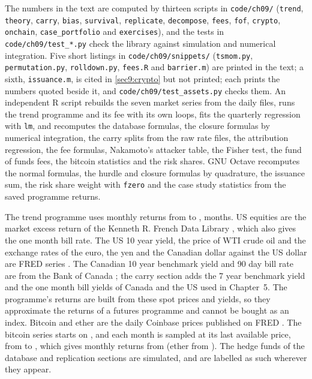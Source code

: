 \begin{chapterrefs}
\begin{keybox}
The numbers in the text are computed by thirteen scripts in \texttt{code/ch09/} (\texttt{trend},
\texttt{theory}, \texttt{carry}, \texttt{bias}, \texttt{survival}, \texttt{replicate},
\texttt{decompose}, \texttt{fees}, \texttt{fof}, \texttt{crypto}, \texttt{onchain},
\texttt{case\_portfolio} and \texttt{exercises}), and the tests in \texttt{code/ch09/test\_*.py} check
the library against simulation and numerical integration. Five short listings in
\texttt{code/ch09/snippets/} (\texttt{tsmom.py}, \texttt{permutation.py}, \texttt{rolldown.py},
\texttt{fees.R} and \texttt{barrier.m}) are printed in the text; a sixth, \texttt{issuance.m}, is
cited in \cref{sec9:crypto} but not printed; each prints the numbers quoted beside
it, and \texttt{code/ch09/test\_assets.py} checks them. An independent R script rebuilds the seven
market series from the daily files, runs the trend programme and its fee with its own loops, fits the
quarterly regression with \texttt{lm}, and recomputes the database formulas, the closure formulas
by numerical integration, the carry splits from the raw rate files, the attribution regression, the
fee formulas, Nakamoto's attacker table, the Fisher test, the fund of funds fees, the bitcoin statistics
and the risk shares. GNU Octave recomputes the normal formulas, the hurdle and closure formulas by
quadrature, the issuance sum, the risk share weight with \texttt{fzero} and the case study statistics
from the saved programme returns.

The trend programme uses monthly returns from \tfFirst{} to \tfLast, \tfMonths{} months. US equities are
the market excess return of the Kenneth R. French Data Library \parencite{frenchlib}, which also gives
the one month bill rate. The US 10 year yield, the price of WTI crude oil and the exchange rates of the
euro, the yen and the Canadian dollar against the US dollar are FRED series \parencite{fredch9}. The
Canadian 10 year benchmark yield and 90 day bill rate are from the Bank of Canada \parencite{bocvalet};
the carry section adds the 7 year benchmark yield and the one month bill yields of Canada and the US
used in Chapter~5. The programme's returns are built from these spot prices and yields, so they
approximate the returns of a futures programme and cannot be bought as an index.
Bitcoin and ether are the daily Coinbase prices published on FRED \parencite{coinbasefred}. The bitcoin
series starts on \btSeriesStart, and each month is sampled at its last available price, from
\btFirstPrice{} to \btLast, which gives monthly returns from \btFirst{} (ether from \ceFirst). The hedge funds of the database and replication sections
are simulated, and are labelled as such wherever they appear.


\end{keybox}
\end{chapterrefs}
